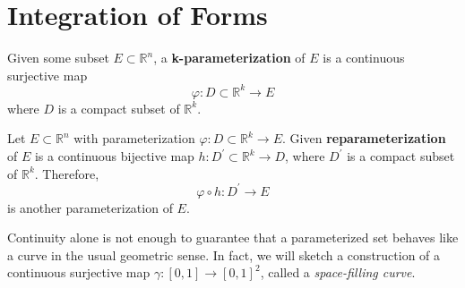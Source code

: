 \section{Integration of Forms}
	
	\begin{definition}[Parameterization]
		Given some subset $E \subset \mathbb{R}^n$, a \textbf{k-parameterization} of $E$ is a continuous surjective map 
		\begin{equation}
		  \varphi: D \subset \mathbb{R}^k \to E
		\end{equation}
		where $D$ is a compact subset of $\mathbb{R}^k$. 
	\end{definition} 
	
	\begin{definition}[Reparameterization]
		Let $E \subset \mathbb{R}^n$ with parameterization $\varphi: D \subset \mathbb{R}^k \to E$. Given \textbf{reparameterization} of $E$ is a continuous bijective map $h: D^\prime \subset \mathbb{R}^k \to D$, where $D^\prime$ is a compact subset of $\mathbb{R}^k$. Therefore, 
		\begin{equation}
		  \varphi \circ h : D^\prime \to E
		\end{equation} 
		is another parameterization of $E$. 
	\end{definition}
	
	
	Continuity alone is not enough to guarantee that a parameterized set behaves like a curve in the usual geometric sense. In fact, we will sketch a construction of a continuous surjective map $\gamma : [0,1] \to [0,1]^2$, called a \textit{space-filling curve}. 
	
